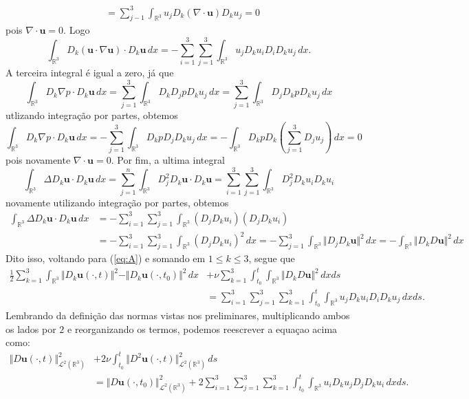 \documentclass[a4paper, 11pt]{book}
\theoremstyle{definition}
\newcommand{\bR}{\mathbb{R}}
\newcommand{\bu}{\mathbf{u}}
\newcommand{\cL}{\mathcal{L}}
\begin{document}
\begin{prf}
\[\begin{aligned}
            &= \sum_{j-1}^3 \int_{\bR^3} u_j D_k (\nabla \cdot \bu) D_k u_j = 0
        \end{aligned}
    \]
    pois $\nabla \cdot \bu = 0$. Logo
    \[
        \int_{\bR^3} D_k ( \bu \cdot \nabla \bu) \cdot D_k \bu \,dx = -\sum_{i=1}^3 \sum_{j=1}^3 \int_{\bR^3} u_j D_k u_i D_i D_k u_j \,dx.
    \]
    A terceira integral é igual a zero, já que
    \[
        \int_{\bR^3} D_k \nabla p \cdot D_k \bu \,dx = \sum_{j=1}^{3} \int_{\bR^3} D_k D_j p D_k u_j \,dx = \sum_{j=1}^3 \int_{\bR^3} D_j D_k p D_k u_j \,dx
    \]
    utlizando integração por partes, obtemos
    \[
        \int_{\bR^3} D_k \nabla p \cdot D_k \bu \,dx = -\sum_{j=1}^3 \int_{\bR^3} D_k p D_j D_k  u_j \,dx = - \int_{\bR^3} D_k p D_k \left( \sum_{j=1}^3 D_j u_j \right) \,dx = 0
    \]
    pois novamente $\nabla \cdot \bu = 0$.
    Por fim, a ultima integral
    \[
        \int_{\bR^3} \Delta D_k \bu \cdot D_k \bu \,dx =  \sum_{j=1}^n \int_{\bR^3} D_j^2 D_k \bu \cdot D_k\bu = \sum_{i=1}^3 \sum_{j=1}^3 \int_{\bR^3} D_j^2 D_k u_i D_k u_i 
    \]
    novamente utilizando integração por partes, obtemos
    \[
        \begin{aligned}
            \int_{\bR^3} \Delta D_k \bu \cdot D_k \bu \,dx &= -\sum_{i=1}^3 \sum_{j=1}^3 \int_{\bR^3} (D_jD_k u_i)(D_jD_k u_i)\\ 
            &= -\sum_{i=1}^3 \sum_{j=1}^3  \int_{\bR^3} (D_j D_k u_i)^2 \,dx = -\!\sum_{j=1}^3  \int_{\bR^3} \Vert D_jD_k \bu \Vert^2 \,dx = -\!\!\int_{\bR^3} \Vert D_kD\bu \Vert^2 \,dx
        \end{aligned}
    \]
    Dito isso, voltando para (\ref{eq:A}) e somando em $1 \leqslant k \leqslant 3$, segue que
    \[
        \begin{aligned}
            \frac{1}{2} \sum_{k=1}^3 \int_{\bR^3} \Vert D_k \bu(\cdot,t) \Vert^2 - \Vert D_k \bu(\cdot,t_0) \Vert^2 \,dx  &+ \nu \sum_{k=1}^3 \int_{t_0}^t \int_{\bR^3} \Vert D_kD\bu \Vert^2 \,dx ds\\
        &= \sum_{i=1}^3 \sum_{j=1}^3\sum_{k=1}^3 \int_{t_0}^{t}\int_{\bR^3} u_j D_k u_i D_i D_k u_j \,dxds.
        \end{aligned}
    \]
    Lembrando da definição das normas vistas nos preliminares, multiplicando ambos os lados por $2$ e reorganizando os termos, podemos reescrever a equaçao acima como:
    \[
        \begin{aligned}
            \Vert D\bu(\cdot,t) \Vert_{\cL^2(\bR^3)}^2 &+ 2\nu \int_{t_0}^t \Vert D^2 \bu(\cdot,t) \Vert_{\cL^2(\bR^3)}^2 \,ds\\ &= \Vert D\bu(\cdot,t_0) \Vert_{\cL^2(\bR^3)}^2 + 2 \sum_{i=1}^3 \sum_{j=1}^3\sum_{k=1}^3 \int_{t_0}^t \int_{\bR^3} u_i D_k u_j D_j D_k u_i \,dxds.

\end{aligned}\]
\end{prf}
\end{document}
